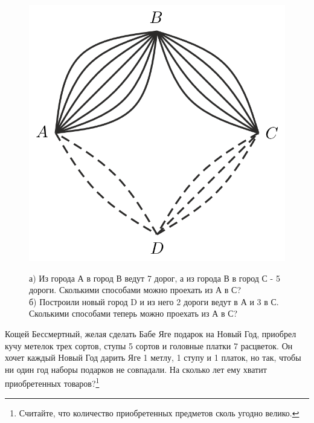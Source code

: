 \begin{figure}[!h]
\begin{minipage}{0.2\linewidth}
    \includegraphics[width=0.9\columnwidth]{./img/ways2}
\end{minipage}
\begin{minipage}{0.79\linewidth}\setlength{\parindent}{1.5em}
\begin{ex}\label{u14}
	а) Из города А в город В ведут 7 дорог, а из города В в город С - 5 дороги. Сколькими способами можно проехать из А в С?
	\\	
	б) Построили новый город D и из него 2 дороги ведут в А и 3 в С. Сколькими способами теперь можно проехать из А в С?
\end{ex}
\end{minipage}
\end{figure}

\begin{ex}\label{u15}
	Кощей Бессмертный, желая сделать Бабе Яге подарок на Новый Год, приобрел кучу метелок трех сортов, ступы 5 сортов и головные платки 7 расцветок. Он хочет каждый Новый Год дарить Яге 1 метлу, 1 ступу и 1 платок, но так, чтобы ни один год наборы подарков не совпадали. На сколько лет ему хватит приобретенных товаров?\footnote{Считайте, что количество приобретенных предметов сколь угодно велико.}
\end{ex}


